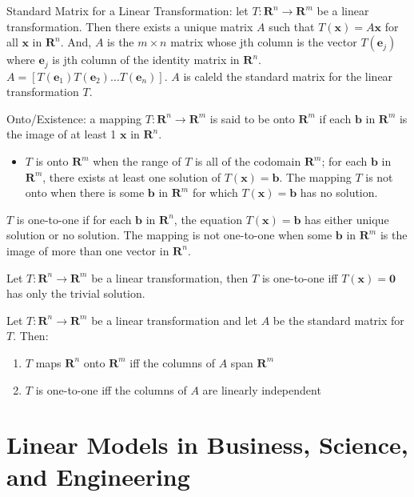 \documentclass[../linalg.tex]{subfiles}
\begin{document}
\begin{theorem}
    Standard Matrix for a Linear Transformation: let $T:\textbf{R}^n\rightarrow \textbf{R}^m$ be a linear transformation. Then there exists a unique matrix $A$ such that 
    $T(\textbf{x})=A\textbf{x}$ for all $\textbf{x}$ in $\textbf{R}^n$. And, $A$ is the $m\times n$ matrix whose jth column is the vector $T(\textbf{e}_j)$ where $\textbf{e}_j$ is jth column 
    of the identity matrix in $\textbf{R}^n$. $A=[T(\textbf{e}_1)T(\textbf{e}_2)\dots T(\textbf{e}_n)]$. $A$ is caleld the standard matrix for the linear transformation $T$.
\end{theorem}

Onto/Existence: a mapping $T:\textbf{R}^n\rightarrow \textbf{R}^m$ is said to be onto $\textbf{R}^m$ if each $\textbf{b}$ in $\textbf{R}^m$ is the image of at least 1 $\textbf{x}$ in $\textbf{R}^n$.
\begin{itemize}
    \item $T$ is onto $\textbf{R}^m$ when the range of $T$ is all of the codomain $\textbf{R}^m$; for each $\textbf{b}$ in $\textbf{R}^m$, there exists at least one solution of $T(\textbf{x})=\textbf{b}$. The mapping $T$ is not onto when there is some $\textbf{b}$ in $\textbf{R}^m$ for which $T(\textbf{x})=\textbf{b}$ has no solution.
\end{itemize}
$T$ is one-to-one if for each $\textbf{b}$ in $\textbf{R}^n$, the equation $T(\textbf{x})=\textbf{b}$ has either unique solution or no solution. The mapping is not one-to-one when some $\textbf{b}$ in $\textbf{R}^m$ is the image of more than one vector in $\textbf{R}^n$.
\begin{theorem}
    Let $T:\textbf{R}^n\rightarrow \textbf{R}^m$ be a linear transformation, then $T$ is one-to-one iff $T(\textbf{x})=\textbf{0}$ has only the trivial solution.
\end{theorem}

\begin{theorem}
    Let $T:\textbf{R}^n\rightarrow \textbf{R}^m$ be a linear transformation and let $A$ be the standard matrix for $T$. Then:
    \begin{enumerate}
        \item $T$ maps $\textbf{R}^n$ onto $\textbf{R}^m$ iff the columns of $A$ span $\textbf{R}^m$
        \item $T$ is one-to-one iff the columns of $A$ are linearly independent
    \end{enumerate}
\end{theorem}





\section{Linear Models in Business, Science, and Engineering}
\end{document}
